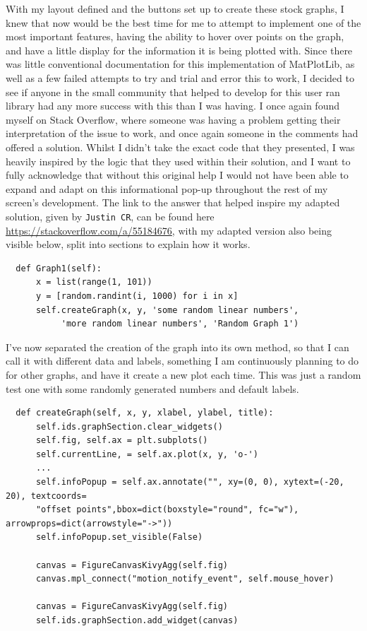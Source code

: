 \documentclass{article}
\begin{document}
With my layout defined and the buttons set up to create these stock graphs, I knew that now would be the best time for me to attempt to implement one of the most important features, having the ability to hover over points on the graph, and have a little display for the information it is being plotted with. Since there was little conventional documentation for this implementation of MatPlotLib, as well as a few failed attempts to try and trial and error this to work, I decided to see if anyone in the small community that helped to develop for this user ran library had any more success with this than I was having. I once again found myself on Stack Overflow, where someone was having a problem getting their interpretation of the issue to work, and once again someone in the comments had offered a solution. Whilst I didn't take the exact code that they presented, I was heavily inspired by the logic that they used within their solution, and I want to fully acknowledge that without this original help I would not have been able to expand and adapt on this informational pop-up throughout the rest of my screen's development. The link to the answer that helped inspire my adapted solution, given by \texttt{Justin CR}, can be found here \url{https://stackoverflow.com/a/55184676}, with my adapted version also being visible below, split into sections to explain how it works.\\\vspace{0.3cm}
\begin{verbatim}
  def Graph1(self):
      x = list(range(1, 101))
      y = [random.randint(i, 1000) for i in x]
      self.createGraph(x, y, 'some random linear numbers', 
           'more random linear numbers', 'Random Graph 1')
\end{verbatim}

\vspace{0.3cm}
I've now separated the creation of the graph into its own method, so that I can call it with different data and labels, something I am continuously planning to do for other graphs, and have it create a new plot each time. This was just a random test one with some randomly generated numbers and default labels.\\\vspace{0.3cm}

\begin{verbatim}
  def createGraph(self, x, y, xlabel, ylabel, title):
      self.ids.graphSection.clear_widgets()
      self.fig, self.ax = plt.subplots()
      self.currentLine, = self.ax.plot(x, y, 'o-')
      ...
      self.infoPopup = self.ax.annotate("", xy=(0, 0), xytext=(-20, 20), textcoords=
      "offset points",bbox=dict(boxstyle="round", fc="w"), arrowprops=dict(arrowstyle="->"))
      self.infoPopup.set_visible(False)

      canvas = FigureCanvasKivyAgg(self.fig)
      canvas.mpl_connect("motion_notify_event", self.mouse_hover)
      
      canvas = FigureCanvasKivyAgg(self.fig)
      self.ids.graphSection.add_widget(canvas)
\end{verbatim}
\end{document}
